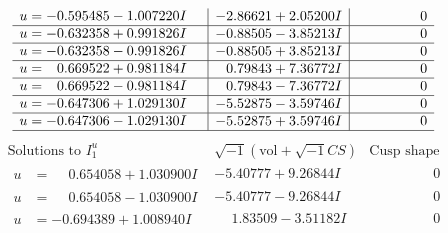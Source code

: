 \documentclass[1p]{elsarticle_modified}
\theoremstyle{definition}
\newcommand{\I}{\sqrt{-1}}
\begin{document}
$$\begin{array}{c|c|c}
\begin{aligned}
u &= -0.595485 - 1.007220 I\end{aligned}
 & -2.86621 + 2.05200 I & \phantom{-0.000000 } 0 \\ \hline\begin{aligned}
u &= -0.632358 + 0.991826 I\end{aligned}
 & -0.88505 - 3.85213 I & \phantom{-0.000000 } 0 \\ \hline\begin{aligned}
u &= -0.632358 - 0.991826 I\end{aligned}
 & -0.88505 + 3.85213 I & \phantom{-0.000000 } 0 \\ \hline\begin{aligned}
u &= \phantom{-}0.669522 + 0.981184 I\end{aligned}
 & \phantom{-}0.79843 + 7.36772 I & \phantom{-0.000000 } 0 \\ \hline\begin{aligned}
u &= \phantom{-}0.669522 - 0.981184 I\end{aligned}
 & \phantom{-}0.79843 - 7.36772 I & \phantom{-0.000000 } 0 \\ \hline\begin{aligned}
u &= -0.647306 + 1.029130 I\end{aligned}
 & -5.52875 - 3.59746 I & \phantom{-0.000000 } 0 \\ \hline\begin{aligned}
u &= -0.647306 - 1.029130 I\end{aligned}
 & -5.52875 + 3.59746 I & \phantom{-0.000000 } 0\\
 \hline 
 \end{array}$$\newpage$$\begin{array}{c|c|c}  
\text{Solutions to }I^u_{1}& \I (\text{vol} + \sqrt{-1}CS) & \text{Cusp shape}\\
 \hline 
\begin{aligned}
u &= \phantom{-}0.654058 + 1.030900 I\end{aligned}
 & -5.40777 + 9.26844 I & \phantom{-0.000000 } 0 \\ \hline\begin{aligned}
u &= \phantom{-}0.654058 - 1.030900 I\end{aligned}
 & -5.40777 - 9.26844 I & \phantom{-0.000000 } 0 \\ \hline\begin{aligned}
u &= -0.694389 + 1.008940 I\end{aligned}
 & \phantom{-}1.83509 - 3.51182 I & \phantom{-0.000000 } 0 \\ \hline\begin{aligned}

\end{aligned}
\end{array}$$
\end{document}
